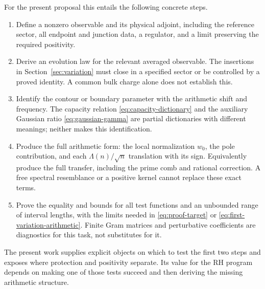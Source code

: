 For the present proposal this entails the following concrete steps.
\begin{enumerate}
 \item Define a nonzero observable and its physical adjoint, including
 the reference sector, all endpoint and junction data, a regulator,
 and a limit preserving the required positivity.
 \item Derive an evolution law for the relevant averaged observable.
 The insertions in Section~\ref{sec:variation} must close in a
 specified sector or be controlled by a proved identity. A common
 bulk charge alone does not establish this.
 \item Identify the contour or boundary parameter with the arithmetic
 shift and frequency. The capacity relation
 \eqref{eq:capacity-dictionary} and the auxiliary Gaussian ratio
 \eqref{eq:gaussian-gamma} are partial dictionaries with different
 meanings; neither makes this identification.
 \item Produce the full arithmetic form: the local normalization
 $w_0$, the pole contribution, and each
 $\Lambda(n)/\sqrt n$ translation with its sign. Equivalently produce
 the full transfer, including the prime comb and rational correction.
 A free spectral resemblance or a positive kernel cannot replace
 these exact terms.
 \item Prove the equality and bounds for all test functions and an
 unbounded range of interval lengths, with the limits needed in
 \eqref{eq:proof-target} or \eqref{eq:first-variation-arithmetic}.
 Finite Gram matrices and perturbative coefficients are diagnostics
 for this task, not substitutes for it.
\end{enumerate}

The present work supplies explicit objects on which to test the first
two steps and exposes where protection and positivity separate. Its
value for the RH program depends on making one of those tests succeed
and then deriving the missing arithmetic structure.
